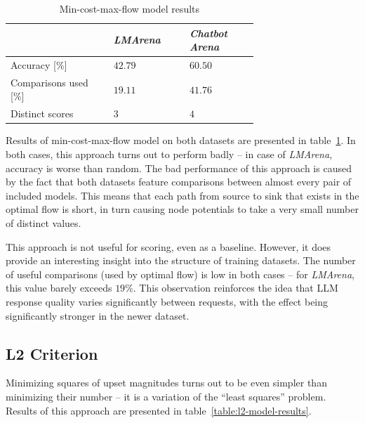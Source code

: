 \documentclass[a4paper,11pt,twoside]{report}
\theoremstyle{definition}
\begin{document}
\begin{table}[htbp]
    \centering
    \caption{Min-cost-max-flow model results}
    \begin{tabular}{
    >{\raggedright\arraybackslash}p{0.3\linewidth}
    >{\centering\arraybackslash}p{0.2\linewidth}
    >{\centering\arraybackslash}p{0.2\linewidth}
    }
        \toprule
        & \textit{LMArena} & \textit{Chatbot Arena} \\
        \midrule
        Accuracy [\%]          & $42.79$ & $60.50$ \\
        Comparisons used [\%]  & $19.11$ & $41.76$ \\
        Distinct scores        & $3$     & $4$     \\
        \bottomrule
    \end{tabular}
    \label{table:l1-model-results}
\end{table}

Results of min-cost-max-flow model on both datasets are presented in table~\ref{table:l1-model-results}. In both cases, this approach turns out to perform badly -- in case of \textit{LMArena}, accuracy is worse than random. The bad performance of this approach is caused by the fact that both datasets feature comparisons between almost every pair of included models. This means that each path from source to sink that exists in the optimal flow is short, in turn causing node potentials to take a very small number of distinct values.

This approach is not useful for scoring, even as a baseline. However, it does provide an interesting insight into the structure of training datasets. The number of useful comparisons (used by optimal flow) is low in both cases -- for \textit{LMArena}, this value barely exceeds $19 \%$. This observation reinforces the idea that LLM response quality varies significantly between requests, with the effect being significantly stronger in the newer dataset.   

\subsection{L2 Criterion}

Minimizing squares of upset magnitudes turns out to be even simpler than minimizing their number -- it is a variation of the ``least squares'' problem. Results of this approach are presented in table~\ref{table:l2-model-results}.
\end{document}
